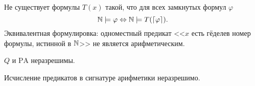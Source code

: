 \documentclass[a4paper, 12pt, num=Г5]{listok}
\renewcommand{\phi}{\varphi}
\begin{document}
\begin{theorem}[Тарского]
	Не существует формулы $T(x)$ такой, что для всех замкнутых формул $\phi$
	\[
		\N \models \phi \Leftrightarrow \N \models T(\lceil \phi \rceil).
	\]
	Эквивалентная формулировка: одноместный предикат <<$x$ есть гёделев номер формулы, истинной в $\mathbb{N}$>> не является арифметическим.
\end{theorem}
\begin{theorem}
	$Q$ и $\mathrm{PA}$ неразрешимы.
\end{theorem}
\begin{theorem}
	Исчисление предикатов в сигнатуре арифметики неразрешимо.
\end{theorem}
\end{document}
